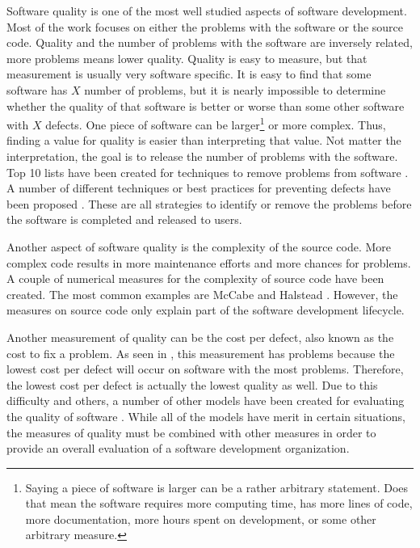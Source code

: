 \documentclass[SDSUThesis.tex]{subfiles}
\begin{document}
    Software quality is one of the most well studied aspects
    of software development.  Most of the work focuses on
    either the problems with the software or the source code.
    Quality and the number of problems with the software
    are inversely related, more problems means lower quality. 
    Quality is easy to measure, but 
    that measurement is usually very software specific.  It is easy
    to find that some software has $X$ number of problems, but
    it is nearly impossible to determine whether the quality
    of that software is better or worse than some other software
    with $X$ defects.  One piece of software can be 
    larger\footnote{Saying a piece of software is larger can be a 
    rather arbitrary statement.  Does that mean the software requires 
    more computing time, has more lines of code, more documentation, 
    more hours spent on development, or some other arbitrary measure.}
    or more complex.  Thus, finding a value for quality is easier 
    than interpreting that value.  Not matter the interpretation,
    the goal is to release the number of problems with the software.
    Top 10 lists have been created for techniques to remove problems
    from software \cite{Boehm2001}.  
    A number of different techniques or best practices
    for preventing defects have 
    been proposed \cite{Faizan2012}.  These are all strategies to identify
    or remove the problems before the software is completed and released
    to users.  
    
    Another aspect of software quality is the complexity of the 
    source code.  More complex code results in more maintenance efforts and
    more chances for problems. A couple of numerical measures for the 
    complexity of source code have been created.  The most common examples
    are McCabe \cite{McCabe1976} and Halstead \cite{Halstead1977}.
    However, the measures on source code only explain part of the 
    software development lifecycle.  
    
    Another measurement of quality can be the cost per defect, also 
    known as the cost to fix a problem.  As seen in \cite{Jones2013},
    this measurement has problems because the lowest cost per
    defect will occur on software with the most problems.  Therefore,
    the lowest cost per defect is actually the lowest quality as well.
    Due to this difficulty and others, a number of other models
    have been created for evaluating the quality of software 
    \cite{Miguel2014}.  While all of the models have merit
    in certain situations, the measures of quality must be combined
    with other measures in order to provide an overall evaluation
    of a software development organization.
    
\end{document}
